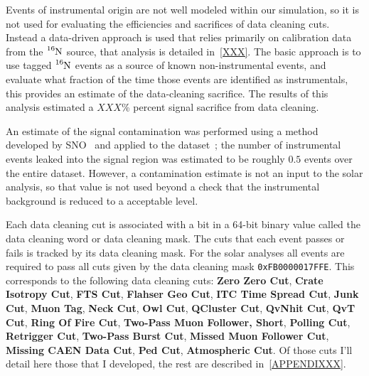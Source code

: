 Events of instrumental origin are not well modeled within our simulation,
so it is not used for evaluating the efficiencies and sacrifices of
data cleaning cuts.
Instead a data-driven approach is used that relies primarily on calibration
data from the $\ce{^{16}N}$ source, that analysis is detailed in~\ref{XXX}.%
The basic approach is to use tagged $\ce{^{16}N}$ events as a source of known
non-instrumental events, and evaluate what fraction of the time those events
are identified as instrumentals, this provides an estimate of the data-cleaning
sacrifice. The results of this analysis estimated a $XXX$\% percent signal
sacrifice from data cleaning.

An estimate of the signal contamination was performed using a method developed
by SNO~\cite{NEIL_THESIS} and applied to the dataset~\cite{DC_DOCUMENT};
the number of instrumental events leaked into the signal region was estimated
to be roughly $0.5$ events over the entire dataset.
However, a contamination estimate is not an input to the solar analysis,
so that value is not used beyond a check that the instrumental background
is reduced to a acceptable level.

Each data cleaning cut is associated with a bit in a 64-bit binary value called
the data cleaning word or data cleaning mask.
The cuts that each event passes or fails is tracked by its data cleaning mask.
For the solar analyses all events are required to pass all cuts
given by the data cleaning mask \texttt{0xFB0000017FFE}.
This corresponds to the following data cleaning cuts:
    \textbf{Zero Zero Cut},
    \textbf{Crate Isotropy Cut},
    \textbf{FTS Cut},
    \textbf{Flahser Geo Cut},
    \textbf{ITC Time Spread Cut},
    \textbf{Junk Cut},
    \textbf{Muon Tag},
    \textbf{Neck Cut},
    \textbf{Owl Cut},
    \textbf{QCluster Cut},
    \textbf{QvNhit Cut},
    \textbf{QvT Cut},
    \textbf{Ring Of Fire Cut},
    \textbf{Two-Pass Muon Follower, Short},
    \textbf{Polling Cut},
    \textbf{Retrigger Cut},
    \textbf{Two-Pass Burst Cut},
    \textbf{Missed Muon Follower Cut},
    \textbf{Missing CAEN Data Cut},
    \textbf{Ped Cut},
    \textbf{Atmospheric Cut}.
Of those cuts I'll detail here those that I developed, the rest are described
in~\ref{APPENDIXXX}.

